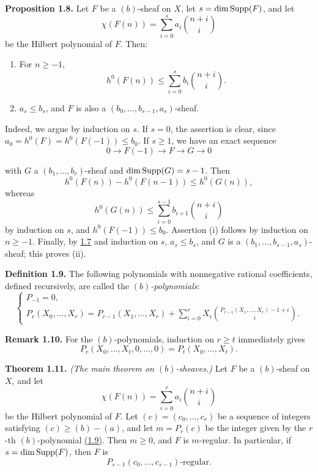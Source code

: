 \textbf{Proposition 1.8.} Let \(F\) be a \((b)\)-sheaf on \(X\), let
\(s=\dim\operatorname{Supp}(F)\), and let
\[
  \chi(F(n))=\sum_{i=0}^{s}a_i\binom{n+i}{i}
\]
be the Hilbert polynomial of \(F\). Then:
\begin{enumerate}[label=(\roman*)]
\item For \(n\geq-1\),
\[
  h^0(F(n))\leq\sum_{i=0}^{s}b_i\binom{n+i}{i}.
\]
\item \(a_s\leq b_s\), and \(F\) is also a
\((b_0,\ldots,b_{s-1},a_s)\)-sheaf.
\end{enumerate}
Indeed, we argue by induction on \(s\). If \(s=0\), the assertion is clear,
since \(a_0=h^0(F)=h^0(F(-1))\leq b_0\). If \(s\geq1\), we have an exact
sequence
\[
  0\longrightarrow F(-1)\longrightarrow F\longrightarrow G\longrightarrow0
\]

\newpage
with \(G\) a \((b_1,\ldots,b_r)\)-sheaf and
\(\dim\operatorname{Supp}(G)=s-1\). Then
\[
  h^0(F(n))-h^0(F(n-1))\leq h^0(G(n)),
\]
whereas
\[
  h^0(G(n))\leq
  \sum_{i=0}^{s-1}b_{i+1}\binom{n+i}{i}
\]
by induction on \(s\), and \(h^0(F(-1))\leq b_0\). Assertion (i) follows
by induction on \(n\geq-1\). Finally, by \hyperlink{sga6.e13.lem.1-7}{1.7} and induction on \(s\),
\(a_s\leq b_s\), and \(G\) is a
\((b_1,\ldots,b_{s-1},a_s)\)-sheaf; this proves (ii).

\textbf{Definition 1.9.} The following polynomials with nonnegative rational
coefficients, defined recursively, are called the \emph{\((b)\)-polynomials}:
\[
\begin{cases}
P_{-1}=0,\\
P_r(X_0,\ldots,X_r)=P_{r-1}(X_1,\ldots,X_r)
+\displaystyle\sum_{i=0}^{r}X_i
\binom{P_{r-1}(X_1,\ldots,X_r)-1+i}{i}.
\end{cases}
\]

\textbf{Remark 1.10.} For the \((b)\)-polynomials, induction on \(r\geq t\)
immediately gives
\[
  P_r(X_0,\ldots,X_t,0,\ldots,0)=P_t(X_0,\ldots,X_t).
\]

\textbf{Theorem 1.11.} \emph{(The main theorem on \((b)\)-sheaves.)} Let
\(F\) be a \((b)\)-sheaf on \(X\), and let
\[
  \chi(F(n))=\sum_{i=0}^{r}a_i\binom{n+i}{i}
\]
be the Hilbert polynomial of \(F\). Let
\((c)=(c_0,\ldots,c_r)\) be a sequence of integers satisfying
\((c)\geq(b)-(a)\), and let \(m=P_r(c)\) be the integer given by the
\(r\)-th \((b)\)-polynomial \hyperlink{sga6.e13.def.1-9}{(1.9)}. Then \(m\geq0\), and \(F\) is
\(m\)-regular. In particular, if \(s=\dim\operatorname{Supp}(F)\), then \(F\) is
\[
  P_{s-1}(c_0,\ldots,c_{s-1})\text{-regular}.
\]

